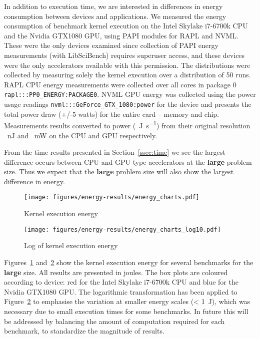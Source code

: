 \documentclass[../document.tex]{subfiles}
\begin{document}
\label{ssec:energy}
	
In addition to execution time, we are interested in differences in energy consumption between devices and applications.
We measured the energy consumption of benchmark kernel execution on the Intel Skylake i7-6700k CPU and the Nvidia GTX1080 GPU, using PAPI modules for RAPL and NVML. 
These were the only devices examined since collection of PAPI energy measurements (with LibSciBench) requires superuser access, and these devices were the only accelerators available with this permission.
The distributions were collected by measuring solely the kernel execution over a distribution of 50 runs.
RAPL CPU energy measurements were collected over all cores in package 0 {\tt rapl:::PP0\_ENERGY:PACKAGE0}.
NVML GPU energy was collected using the power usage readings {\tt nvml:::GeForce\_GTX\_1080:power} for the device and presents the total power draw (+/-5 watts) for the entire card -- memory and chip.
Measurements results converted to power (\SI{}{\joule\per\second}) from their original resolution \SI{}{\nano\joule} and \SI{}{\milli\watt} on the CPU and GPU respectively.

From the time results presented in Section~\ref{ssec:time} we see the largest difference occurs between CPU and GPU type accelerators at the {\bf large} problem size.
Thus we expect that the {\bf large} problem size will also show the largest difference in energy.

\begin{figure*}[htb]
\begin{subfigure}{.49\textwidth}
\centering
\texttt{[image: figures/energy-results/energy\_charts.pdf]}
\caption{Kernel execution energy}
\label{fig:energy}
\end{subfigure}
\hfill
\begin{subfigure}{.49\textwidth}
\centering
\texttt{[image: figures/energy-results/energy\_charts\_log10.pdf]}
\caption{Log of kernel execution energy}
\label{fig:energy-log}
\end{subfigure}
\caption{Benchmark kernel execution energy ({\bf large} problem size) on Core i7-6700K and Nvidia GTX1080}
\end{figure*}


Figures~\ref{fig:energy} and~\ref{fig:energy-log} show the kernel execution energy for several benchmarks for the {\bf large} size.
All results are presented in joules.
The box plots are coloured according to device: red for the Intel Skylake i7-6700k CPU and blue for the Nvidia GTX1080 GPU.
The logarithmic transformation has been applied to Figure~\ref{fig:energy-log} to emphasise the variation at smaller energy scales (< \SI{1}{\joule}), which was necessary due to small execution times for some benchmarks.
In future this will be addressed by balancing the amount of computation required for each benchmark, to standardize the magnitude of results.
\end{document}
